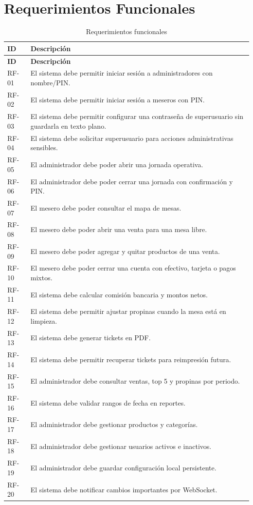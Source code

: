 \documentclass[11pt,letterpaper,openany]{report}
\begin{document}
\section{Requerimientos Funcionales}

\begin{longtable}{p{}p{}}
\caption{Requerimientos funcionales}\\
\toprule
\textbf{ID} & \textbf{Descripción}\\
\midrule
\endfirsthead
\toprule
\textbf{ID} & \textbf{Descripción}\\
\midrule
\endhead
RF-01 & El sistema debe permitir iniciar sesión a administradores con nombre/PIN.\\
RF-02 & El sistema debe permitir iniciar sesión a meseros con PIN.\\
RF-03 & El sistema debe permitir configurar una contraseña de superusuario sin guardarla en texto plano.\\
RF-04 & El sistema debe solicitar superusuario para acciones administrativas sensibles.\\
RF-05 & El administrador debe poder abrir una jornada operativa.\\
RF-06 & El administrador debe poder cerrar una jornada con confirmación y PIN.\\
RF-07 & El mesero debe poder consultar el mapa de mesas.\\
RF-08 & El mesero debe poder abrir una venta para una mesa libre.\\
RF-09 & El mesero debe poder agregar y quitar productos de una venta.\\
RF-10 & El mesero debe poder cerrar una cuenta con efectivo, tarjeta o pagos mixtos.\\
RF-11 & El sistema debe calcular comisión bancaria y montos netos.\\
RF-12 & El sistema debe permitir ajustar propinas cuando la mesa está en limpieza.\\
RF-13 & El sistema debe generar tickets en PDF.\\
RF-14 & El sistema debe permitir recuperar tickets para reimpresión futura.\\
RF-15 & El administrador debe consultar ventas, top 5 y propinas por periodo.\\
RF-16 & El sistema debe validar rangos de fecha en reportes.\\
RF-17 & El administrador debe gestionar productos y categorías.\\
RF-18 & El administrador debe gestionar usuarios activos e inactivos.\\
RF-19 & El administrador debe guardar configuración local persistente.\\
RF-20 & El sistema debe notificar cambios importantes por WebSocket.\\
\bottomrule
\end{longtable}
\end{document}
